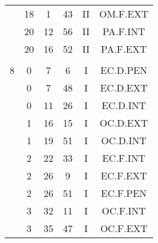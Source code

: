 \documentclass[12pt, a4paper]{article}
\begin{document}
\begin{multicols}{3}
{\begin{tabular}{c c c c c c}
	 	 	 	 & 18 & 1 & 43 & II & OM.F.EXT\\%
	 	 	 	 & 20 & 12 & 56 & II & PA.F.INT\\%
	 	 	 	 & 20 & 16 & 52 & II & PA.F.EXT\\%
	 	 	 	 & & & & & \\%
	 	 	 	8 & 0 & 7 & 6 & I & EC.D.PEN\\%
	 	 	 	 & 0 & 7 & 48 & I & EC.D.EXT\\%
	 	 	 	 & 0 & 11 & 26 & I & EC.D.INT\\%
	 	 	 	 & 1 & 16 & 15 & I & OC.D.EXT\\%
	 	 	 	 & 1 & 19 & 51 & I & OC.D.INT\\%
	 	 	 	 & 2 & 22 & 33 & I & EC.F.INT\\%
	 	 	 	 & 2 & 26 & 9 & I & EC.F.EXT\\%
	 	 	 	 & 2 & 26 & 51 & I & EC.F.PEN\\%
	 	 	 	 & 3 & 32 & 11 & I & OC.F.INT\\%
	 	 	 	 & 3 & 35 & 47 & I & OC.F.EXT\\%
	 	 \end{tabular}
 	}
\end{multicols}
\end{document}
